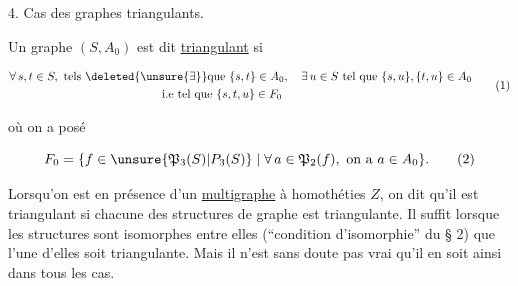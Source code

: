 
4. Cas des graphes triangulants.

Un graphe $(S,A_0)$  est dit \uline{triangulant} si

\[
\begin{aligned}
&\forall\,s,t\in S,\ \text{tels }\deleted{\unsure{\exists}}\text{que }\{s,t\}\in A_0,\quad
\exists\,u\in S\ \text{tel que }\{s,u\},\{t,u\}\in A_0\\
&\hspace{13em}\text{i.e tel que }\{s,t,u\}\in F_0
\end{aligned}\tag*{(1)}
\]

où on a posé

\[
F_0=\{f\in\unsure{\mathfrak P_3(S)|P_3(S)}\mid\forall\,a\in\mathfrak P_2(f),\ \text{on a }a\in A_0\}.\tag*{(2)}
\]

Lorsqu'on est en présence d'un \uline{multigraphe} à homothéties  $Z$, on dit qu'il est triangulant si chacune des structures de graphe est triangulante. Il suffit  lorsque les  structures sont isomorphes entre elles (``condition d'isomorphie'' du § 2) que l'une d'elles soit triangulante.  Mais il n'est  sans doute pas vrai qu'il en soit ainsi dans tous les cas.
